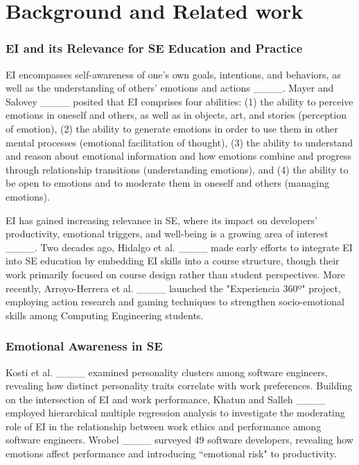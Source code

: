 \section{Background and Related work}
\subsubsection{EI and its Relevance for SE Education and Practice} EI encompasses self-awareness of one’s own goals, intentions, and behaviors, as well as the understanding of others' emotions and actions ____. Mayer and Salovey ____ posited that EI comprises four abilities: (1) the ability to perceive emotions in oneself and others, as well as in objects, art, and stories (perception of emotion), (2) the ability to generate emotions in order to use them in other mental processes (emotional facilitation of thought), (3) the ability to understand and reason about emotional information and how emotions combine and progress through relationship transitions (understanding emotions), and (4) the ability to be open to emotions and to moderate them in oneself and others (managing emotions). %

EI has gained increasing relevance in SE, where its impact on developers' productivity, emotional triggers, and well-being is a growing area of interest ____. Two decades ago, Hidalgo et al. ____ made early efforts to integrate EI into SE education by embedding EI skills into a course structure, though their work primarily focused on course design rather than student perspectives. More recently, Arroyo-Herrera et al. ____ launched the "Experiencia 360º" project, employing action research and gaming techniques to strengthen socio-emotional skills among Computing Engineering students.



\subsubsection{Emotional Awareness in SE} 
Kosti et al. ____ examined personality clusters among software engineers, revealing how distinct personality traits correlate with work preferences. Building on the intersection of EI and work performance, Khatun and Salleh ____ employed hierarchical multiple regression analysis to investigate the moderating role of EI in the relationship between work ethics and performance among software engineers. Wrobel ____ surveyed 49 software developers, revealing how emotions affect performance and introducing ``emotional risk" to productivity.


